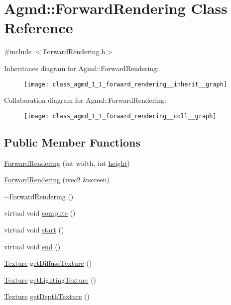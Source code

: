 \hypertarget{class_agmd_1_1_forward_rendering}{\section{Agmd\+:\+:Forward\+Rendering Class Reference}
\label{class_agmd_1_1_forward_rendering}
}


{\ttfamily \#include $<$Forward\+Rendering.\+h$>$}



Inheritance diagram for Agmd\+:\+:Forward\+Rendering\+:\nopagebreak
\begin{figure}[H]
\begin{center}
\leavevmode
\texttt{[image: class\_agmd\_1\_1\_forward\_rendering\_\_inherit\_\_graph]}
\end{center}
\end{figure}


Collaboration diagram for Agmd\+:\+:Forward\+Rendering\+:\nopagebreak
\begin{figure}[H]
\begin{center}
\leavevmode
\texttt{[image: class\_agmd\_1\_1\_forward\_rendering\_\_coll\_\_graph]}
\end{center}
\end{figure}
\subsection*{Public Member Functions}
\begin{DoxyCompactItemize}
\item 
\hyperlink{class_agmd_1_1_forward_rendering_a273553863a148fc7b5d4a47d5875a9df}{Forward\+Rendering} (int width, int \hyperlink{_examples_2_bezier_2_app_8cpp_a48083b65ac9a863566dc3e3fff09a5b4}{height})
\item 
\hyperlink{class_agmd_1_1_forward_rendering_a90e541ac43ef679bcb0da8c82cfd1c58}{Forward\+Rendering} (ivec2 \&screen)
\item 
\hyperlink{class_agmd_1_1_forward_rendering_a4325e644bafca8cc1331a193881860c3}{$\sim$\+Forward\+Rendering} ()
\item 
virtual void \hyperlink{class_agmd_1_1_forward_rendering_a439976e5f442bf382e827f786f3e34f1}{compute} ()
\item 
virtual void \hyperlink{class_agmd_1_1_forward_rendering_a2b3207d31479b4aabda32e0c7de8fc7a}{start} ()
\item 
virtual void \hyperlink{class_agmd_1_1_forward_rendering_a663d915f7286225648d33d92e9eb2d3f}{end} ()
\item 
\hyperlink{class_agmd_1_1_texture}{Texture} \hyperlink{class_agmd_1_1_forward_rendering_a1beb4b5bda961c2bf273eb08616e9118}{get\+Diffuse\+Texture} ()
\item 
\hyperlink{class_agmd_1_1_texture}{Texture} \hyperlink{class_agmd_1_1_forward_rendering_acb3da9f4502988207755f1d0e969e75c}{get\+Lighting\+Texture} ()
\item 
\hyperlink{class_agmd_1_1_texture}{Texture} \hyperlink{class_agmd_1_1_forward_rendering_a65b40a1c13c5570b7644dd11b8380bd2}{get\+Depth\+Texture} ()
\end{DoxyCompactItemize}
